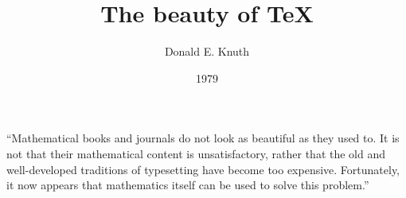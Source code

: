 \documentclass{article}
\title{The beauty of \TeX}
\author{Donald E. Knuth}
\date{1979}
\begin{document}
  \maketitle

``Mathematical books and journals do not look as 
beautiful as they used to. It is not that their 
mathematical content is unsatisfactory, rather that 
the old and well-developed traditions of typesetting 
have become too expensive. Fortunately, it now appears 
that mathematics itself can be used to solve 
this problem.''
\end{document}

